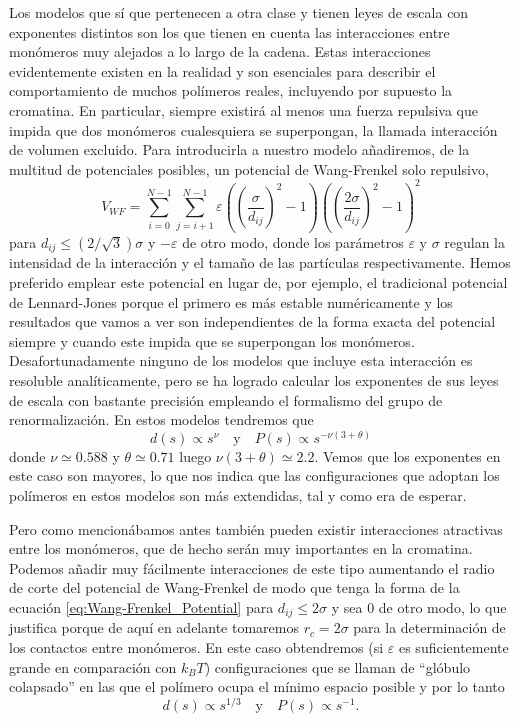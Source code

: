 Los modelos que sí que pertenecen a otra clase y tienen leyes de escala con exponentes distintos son los que tienen en cuenta las interacciones entre monómeros muy alejados a lo largo de la cadena. Estas interacciones evidentemente existen en la realidad y son esenciales para describir el comportamiento de muchos polímeros reales, incluyendo por supuesto la cromatina. En particular, siempre existirá al menos una fuerza repulsiva que impida que dos monómeros cualesquiera se superpongan, la llamada interacción de volumen excluido. Para introducirla a nuestro modelo añadiremos, de la multitud de potenciales posibles, un potencial de Wang-Frenkel \cite{Wang2020} solo repulsivo,
\begin{equation}
    \label{eq:Wang-Frenkel_Potential}
    V_{WF}=\sum_{i=0}^{N-1}\sum_{j=i+1}^{N-1}\varepsilon\left(\left(\frac{\sigma}{d_{ij}}\right)^{2}-1\right)\left(\left(\frac{2\sigma}{d_{ij}}\right)^{2}-1\right)^{2}
\end{equation}
para $d_{ij}\leq\left(2/\sqrt{3}\right)\sigma$ y $-\varepsilon$ de otro modo, donde los parámetros $\varepsilon$ y $\sigma$ regulan la intensidad de la interacción y el tamaño de las partículas respectivamente. Hemos preferido emplear este potencial en lugar de, por ejemplo, el tradicional potencial de Lennard-Jones porque el primero es más estable numéricamente y los resultados que vamos a ver son independientes de la forma exacta del potencial siempre y cuando este impida que se superpongan los monómeros. Desafortunadamente ninguno de los modelos que incluye esta interacción es resoluble analíticamente, pero se ha logrado calcular los exponentes de sus leyes de escala con bastante precisión empleando el formalismo del grupo de renormalización. En estos modelos tendremos que \cite{desCloizeaux1980}
\begin{equation}
    \label{eq:excluded_volume_sd_cp}
    d(s)\propto s^{\nu}  \quad \text{y} \quad P(s)\propto s^{-\nu(3+\theta)}
\end{equation}
donde $\nu\simeq0.588$ y $\theta\simeq0.71$ luego $\nu(3+\theta)\simeq2.2$. Vemos que los exponentes en este caso son mayores, lo que nos indica que las configuraciones que adoptan los polímeros en estos modelos son más extendidas, tal y como era de esperar.

Pero como mencionábamos antes también pueden existir interacciones atractivas entre los monómeros, que de hecho serán muy importantes en la cromatina. Podemos añadir muy fácilmente interacciones de este tipo aumentando el radio de corte del potencial de Wang-Frenkel de modo que tenga la forma de la ecuación \ref{eq:Wang-Frenkel_Potential} para $d_{ij}\leq2\sigma$ y sea $0$ de otro modo, lo que justifica porque de aquí en adelante tomaremos $r_c=2\sigma$ para la determinación de los contactos entre monómeros. En este caso obtendremos (si $\varepsilon$ es suficientemente grande en comparación con $k_BT$) configuraciones que se llaman de ``glóbulo colapsado'' en las que el polímero ocupa el mínimo espacio posible y por lo tanto
\begin{equation}
    \label{eq:collapsed_globule_sd_cp}
    d(s)\propto s^{1/3}  \quad \text{y} \quad P(s)\propto s^{-1}.
\end{equation}
